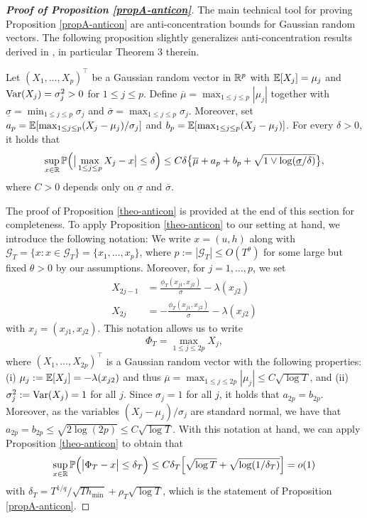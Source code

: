 \begin{proof}[\textnormal{\textbf{Proof of Proposition \ref{propA-anticon}}}] 
The main technical tool for proving Proposition \ref{propA-anticon} are anti-concentration bounds for Gaussian random vectors. The following proposition slightly generalizes anti-concentration results derived in \cite{Chernozhukov2015}, in particular Theorem 3 therein. 
\begin{propA}\label{theo-anticon}
Let $(X_1,\ldots,X_p)^\top$ be a Gaussian random vector in $\mathbb{R}^p$ with $\mathbb{E}[X_j] = \mu_j$ and $\textnormal{Var}(X_j) = \sigma_j^2 > 0$ for $1 \le j \le p$. Define $\overline{\mu} = \max_{1 \le j \le p} |\mu_j|$ together with $\underline{\sigma} = \min_{1 \le j \le p} \sigma_j$ and $\overline{\sigma} = \max_{1 \le j \le p} \sigma_j$. Moreover, set $a_p = \mathbb{E}[ \max_{1 \le j \le p} (X_j-\mu_j)/\sigma_j ]$ and $b_p = \mathbb{E}[ \max_{1 \le j \le p} (X_j-\mu_j) ]$. For every $\delta > 0$, it holds that
\[ \sup_{x \in \mathbb{R}} \mathbb{P} \Big( \big| \max_{1 \le j \le p} X_j - x \big| \le \delta \Big) \le C \delta \big\{ \overline{\mu} + a_p + b_p + \sqrt{1 \vee \log(\underline{\sigma}/\delta)} \big\}, \]
where $C > 0$ depends only on $\underline{\sigma}$ and $\overline{\sigma}$. 
\end{propA} 
The proof of Proposition \ref{theo-anticon} is provided at the end of this section for completeness. To apply Proposition \ref{theo-anticon} to our setting at hand, we introduce the following notation: We write $x = (u,h)$ along with $\mathcal{G}_T = \{ x : x \in \mathcal{G}_T \} = \{x_1,\ldots,x_p\}$, where $p := |\mathcal{G}_T| \le O(T^\theta)$ for some large but fixed $\theta > 0$ by our assumptions. Moreover, for $j = 1,\ldots,p$, we set 
\begin{align*}
X_{2j-1} & = \frac{\phi_T(x_{j1},x_{j2})}{\sigma} - \lambda(x_{j2}) \\
X_{2j} & = -\frac{\phi_T(x_{j1},x_{j2})}{\sigma} - \lambda(x_{j2}) 
\end{align*}
with $x_j = (x_{j1},x_{j2})$. This notation allows us to write
\[ \Phi_T = \max_{1 \le j \le 2p} X_j, \]
where $(X_1,\ldots,X_{2p})^\top$ is a Gaussian random vector with the following properties: (i) $\mu_j := \mathbb{E}[X_j] = - \lambda(x_{j2})$ and thus $\overline{\mu} = \max_{1 \le j \le 2p} |\mu_j| \le C \sqrt{\log T}$, and (ii) $\sigma_j^2 := \textnormal{Var}(X_j) = 1$ for all $j$. Since $\sigma_j = 1$ for all $j$, it holds that $a_{2p} = b_{2p}$. Moreover, as the variables $(X_j - \mu_j)/\sigma_j$ are standard normal, we have that $a_{2p} = b_{2p} \le \sqrt{2 \log (2p)} \le C \sqrt{\log T}$. With this notation at hand, we can apply Proposition \ref{theo-anticon} to obtain that 
\[ \sup_{x \in \mathbb{R}} \mathbb{P} \Big( \big| \Phi_T - x \big| \le \delta_T \Big) \le C \delta_T \Big[ \sqrt{\log T} + \sqrt{ \log(1/\delta_T) } \Big] = o(1) \]
with $\delta_T = T^{1/q} / \sqrt{T h_{\min}} + \rho_T \sqrt{\log T}$, which is the statement of Proposition \ref{propA-anticon}.
\end{proof}




